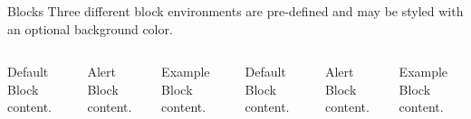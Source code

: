 \begin{frame}{Blocks}
  Three different block environments are pre-defined and may be styled with an
  optional background color.

  \begin{columns}[T,onlytextwidth]
      \begin{block}{Default}
        Block content.
      \end{block}

      \begin{alertblock}{Alert}
        Block content.
      \end{alertblock}

      \begin{exampleblock}{Example}
        Block content.
      \end{exampleblock}



      \begin{block}{Default}
        Block content.
      \end{block}

      \begin{alertblock}{Alert}
        Block content.
      \end{alertblock}

      \begin{exampleblock}{Example}
        Block content.
      \end{exampleblock}

  \end{columns}
\end{frame}

